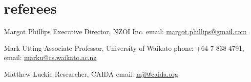 \documentclass[]{boris-cv}
\begin{document}
\section{referees}

  {Margot Phillips}
  {Executive Director, NZOI Inc.}
  {email: \href{mailto:margot.phillips@gmail.com}{margot.phillips@gmail.com}}

  {Mark Utting}
  {Associate Professor, University of Waikato}
  {phone: +64 7 838 4791,
  email: \href{mailto:marku@cs.waikato.ac.nz}{marku@cs.waikato.ac.nz}}

  {Matthew Luckie}
  {Researcher, CAIDA}
  {email: \href{mailto:mjl@caida.org}{mjl@caida.org}}
\end{document}
